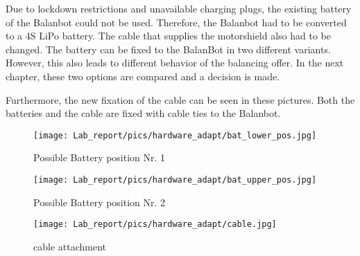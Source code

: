 Due to lockdown restrictions and unavailable charging plugs, the existing battery of the Balanbot could not be used. Therefore, the Balanbot had to be converted to a 4S LiPo battery. The cable that supplies the motorshield also had to be changed. The battery can be fixed to the BalanBot in two different variants. However, this also leads to different behavior of the balancing offer. In the next chapter, these two options are compared and a decision is made.

Furthermore, the new fixation of the cable can be seen in these pictures. Both the batteries and the cable are fixed with cable ties to the Balanbot.
\begin{figure}[H]
    \centering
    \texttt{[image: Lab\_report/pics/hardware\_adapt/bat\_lower\_pos.jpg]}
    \caption{Possible Battery position Nr. 1}
    \label{fig:lower_bat_pos}
\end{figure}

\begin{figure}[H]
    \centering
    \texttt{[image: Lab\_report/pics/hardware\_adapt/bat\_upper\_pos.jpg]}
    \caption{Possible Battery position Nr. 2 }
    \label{fig:upperlower_bat_pos}
\end{figure}

\begin{figure}[H]
    \centering
    \texttt{[image: Lab\_report/pics/hardware\_adapt/cable.jpg]}
    \caption{cable attachment}
    \label{fig:cable}
\end{figure}

